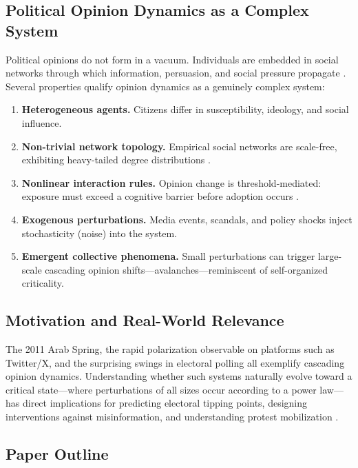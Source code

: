 \documentclass[11pt,twocolumn]{article}
\begin{document}
\subsection{Political Opinion Dynamics as a Complex System}

Political opinions do not form in a vacuum. Individuals are embedded in social networks through which information, persuasion, and social pressure propagate \citep{Castellano2009}. Several properties qualify opinion dynamics as a genuinely complex system:

\begin{enumerate}
\item \textbf{Heterogeneous agents.} Citizens differ in susceptibility, ideology, and social influence.
\item \textbf{Non-trivial network topology.} Empirical social networks are scale-free, exhibiting heavy-tailed degree distributions \citep{Barabasi1999}.
\item \textbf{Nonlinear interaction rules.} Opinion change is threshold-mediated: exposure must exceed a cognitive barrier before adoption occurs \citep{Granovetter1978}.
\item \textbf{Exogenous perturbations.} Media events, scandals, and policy shocks inject stochasticity (noise) into the system.
\item \textbf{Emergent collective phenomena.} Small perturbations can trigger large-scale cascading opinion shifts---avalanches---reminiscent of self-organized criticality.
\end{enumerate}

\subsection{Motivation and Real-World Relevance}

The 2011 Arab Spring, the rapid polarization observable on platforms such as Twitter/X, and the surprising swings in electoral polling all exemplify cascading opinion dynamics. Understanding whether such systems naturally evolve toward a critical state---where perturbations of all sizes occur according to a power law---has direct implications for predicting electoral tipping points, designing interventions against misinformation, and understanding protest mobilization \citep{Watts2002}.

\subsection{Paper Outline}
\end{document}
